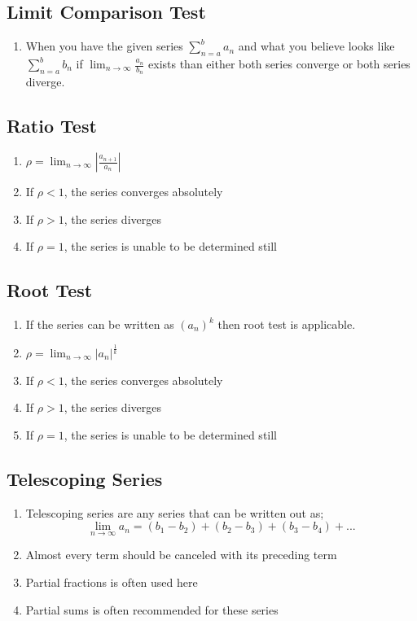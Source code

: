 \documentclass[12pt]{article}
\begin{document}
\subsection{Limit Comparison Test}

\begin{enumerate}
\item When you have the given series $\sum\limits_{n=a}^{b} a_n$ and what you believe looks like $\sum\limits_{n=a}^{b} b_n$  if $\lim_{n \rightarrow \infty } \frac{a_n}{b_n} $ exists than either both series converge or both series diverge.
\end{enumerate}


\subsection{Ratio Test}

\begin{enumerate}
\item $\rho = \lim_{n \rightarrow \infty} | \frac{a_{n+1}}{a_n} |$
\item If $\rho < 1$, the series converges absolutely
\item If $\rho > 1$, the series diverges
\item If $\rho = 1$, the series is unable to be determined still
\end{enumerate}


\subsection{Root Test}

\begin{enumerate}
\item If the series can be written as $ \left ( a_n \right ) ^{k}$ then root test is applicable.
\item $\rho = \lim_{n \rightarrow \infty}  |a_n| ^{ \frac{1}{k} }$
\item If $\rho < 1$, the series converges absolutely
\item If $\rho > 1$, the series diverges
\item If $\rho = 1$, the series is unable to be determined still
\end{enumerate}


\subsection{Telescoping Series}

\begin{enumerate}
\item Telescoping series are any series that can be written out as;
\[
	\lim_{n \rightarrow \infty}  a_n = (b_1 - b_2) + (b_2 - b_3) + (b_3 - b_4) + ...
\]
\item Almost every term should be canceled with its preceding term
\item Partial fractions is often used here
\item Partial sums is often recommended for these series
\end{enumerate}
\end{document}
